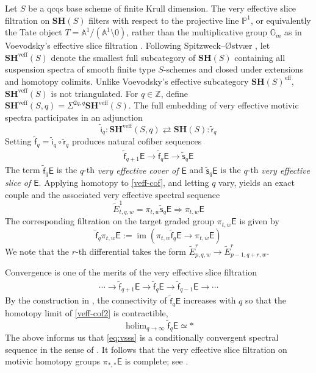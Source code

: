 \documentclass[11pt,hyp,english]{article}
\newcommand{\E}{\mathsf{E}}
\newcommand{\Z}{\mathbb{Z}}
\newcommand{\SH}{\mathbf{SH}}
\newcommand{\holim}{\operatorname{holim}}
\newcommand{\im}{\operatorname{im}}
\newcommand{\vs}{\tilde{\mathsf{s}}}
\newcommand{\vf}{\tilde{{\mathsf{f}}}}
\newcommand{\eff}{\text{eff}}
\newcommand{\veff}{\text{veff}}
\theoremstyle{definition}
\begin{document}
Let $S$ be a qcqs base scheme of finite Krull dimension. The very effective slice filtration on $\SH(S)$ filters with respect to the projective line $\mathbb{P}^1$, or equivalently the Tate object $T=\mathbb{A}^1/(\mathbb{A}^1\setminus{0})$, rather than the multiplicative group $\mathbb{G}_m$ as in Voevodsky’s effective slice filtration \cite{zbMATH02078162}.
Following Spitzweck–{\O}stv{\ae}r \cite{SO:twisted}, let $\SH^\veff(S)$ denote the smallest full subcategory of $\SH(S)$ containing all suspension spectra of smooth finite type $S$-schemes and closed under extensions and homotopy colimits. Unlike Voevodsky’s effective subcategory $\SH(S)^\eff$, $\SH^\veff(S)$ is not triangulated. For $q\in\Z$, define
$\SH^\veff(S,q) =  \Sigma^{2q,q} \SH^\veff(S)$.
The full embedding of very effective motivic spectra participates in an adjunction
\begin{equation}
\label{equation:veffadjunction}
\tilde{\mathsf{i}}_{q} : \SH^\veff(S,q) \rightleftarrows \SH(S) : \tilde{\mathsf{r}}_{q}
\end{equation}
Setting $\vf_{q} = \tilde{\mathsf{i}}_{q}\circ \tilde{\mathsf{r}}_{q}$ produces natural cofiber sequences
\begin{align}
\label{veff-cof}
\vf_{q+1}\E  \to \vf_{q}\E  \to \vs_{q}\E 
\end{align}
The term $\vf_{q}\E $ is the $q$-th \emph{very effective cover of $\E$}
and $\vs_{q}\E $ is the $q$-th \emph{very effective slice of $\E$}. 
Applying homotopy to \eqref{veff-cof}, 
and letting $q$ vary, 
yields an exact couple and the associated very effective spectral sequence 
\begin{equation}
\label{eq:vsss}
\tilde{E}^1_{t,q,w} = 
\pi_{t,w}\vs_{q}\E 
\Longrightarrow 
\pi_{t,w}\E 
\end{equation}
The corresponding filtration on the target graded group $\pi_{t,w}\E $ is given by
\begin{equation}
\label{eq:vssstarget}
\vf_{q}\pi_{t,w}\E  
:= 
\im(\pi_{t,w}\vf_{q}\E  \to \pi_{t,w}\E)
\end{equation}
We note that the $r$-th differential takes the form $\tilde{E}^r_{p,q,w} \to \tilde{E}^r_{p-1,q+r,w}$.

Convergence is one of the merits of the very effective slice filtration
\begin{align}
\label{veff-cof2}
\cdots \to \vf_{q+1}\E  \to \vf_{q}\E  \to \vf_{q-1}\E  \to \cdots
\end{align}
By the construction in 
\cite[Section 5]{SO:twisted}, 
the connectivity of $\vf_{q}\E $ increases with $q$ so that the homotopy limit of 
\eqref{veff-cof2} is contractible,
\begin{equation}
\label{equation:veryeffectivelimit}
\holim_{q\to\infty}\vf_{q}\E \simeq\ast   
\end{equation}
The above informs us that \eqref{eq:vsss} is a conditionally convergent spectral sequence in the sense of 
\cite[Definition 5.10]{Boardman}.
It follows that the very effective slice filtration on motivic homotopy groups $\pi_{\ast,\ast}\E $ is complete;
see \cite[Lemma 5.11]{Boardman}.
\end{document}
